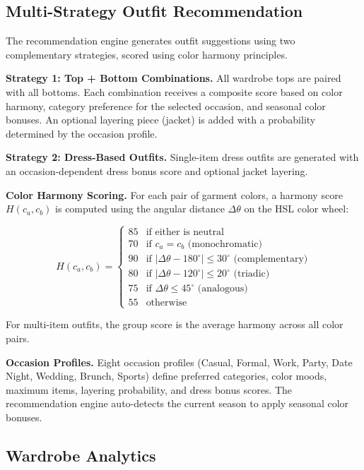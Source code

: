 \documentclass[conference]{IEEEtran}
\begin{document}
\subsection{Multi-Strategy Outfit Recommendation}

The recommendation engine generates outfit suggestions using two complementary strategies, scored using color harmony principles.

\textbf{Strategy 1: Top + Bottom Combinations.} All wardrobe tops are paired with all bottoms. Each combination receives a composite score based on color harmony, category preference for the selected occasion, and seasonal color bonuses. An optional layering piece (jacket) is added with a probability determined by the occasion profile.

\textbf{Strategy 2: Dress-Based Outfits.} Single-item dress outfits are generated with an occasion-dependent dress bonus score and optional jacket layering.

\textbf{Color Harmony Scoring.} For each pair of garment colors, a harmony score $H(c_a, c_b)$ is computed using the angular distance $\Delta\theta$ on the HSL color wheel:

\begin{equation}
    H(c_a, c_b) = \begin{cases}
    85 & \text{if either is neutral} \\
    70 & \text{if } c_a = c_b \text{ (monochromatic)} \\
    90 & \text{if } |\Delta\theta - 180^{\circ}| \leq 30^{\circ} \text{ (complementary)} \\
    80 & \text{if } |\Delta\theta - 120^{\circ}| \leq 20^{\circ} \text{ (triadic)} \\
    75 & \text{if } \Delta\theta \leq 45^{\circ} \text{ (analogous)} \\
    55 & \text{otherwise}
    \end{cases}
\end{equation}

For multi-item outfits, the group score is the average harmony across all color pairs.

\textbf{Occasion Profiles.} Eight occasion profiles (Casual, Formal, Work, Party, Date Night, Wedding, Brunch, Sports) define preferred categories, color moods, maximum items, layering probability, and dress bonus scores. The recommendation engine auto-detects the current season to apply seasonal color bonuses.

\subsection{Wardrobe Analytics}
\end{document}
